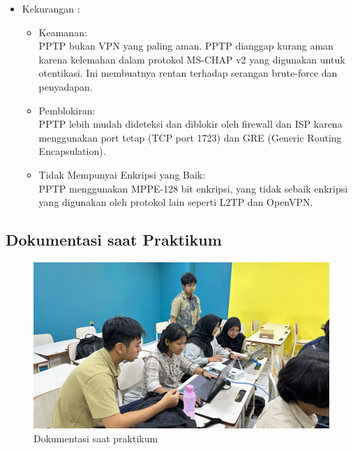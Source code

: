\begin{enumerate}
\begin{itemize}
		\item Kekurangan :
		\begin{itemize}
			\item[\ding{56}] Keamanan: \\ PPTP bukan VPN yang paling aman. PPTP dianggap kurang aman karena kelemahan dalam protokol MS-CHAP v2 yang digunakan untuk otentikasi. Ini membuatnya rentan terhadap serangan brute-force dan penyadapan.
			\item[\ding{56}] Pemblokiran: \\ PPTP lebih mudah dideteksi dan diblokir oleh firewall dan ISP karena menggunakan port tetap (TCP port 1723) dan GRE (Generic Routing Encapsulation).
			\item[\ding{56}] Tidak Mempunyai Enkripsi yang Baik: \\ PPTP menggunakan MPPE-128 bit enkripsi, yang tidak sebaik enkripsi yang digunakan oleh protokol lain seperti L2TP dan OpenVPN.
		\end{itemize}
	\end{itemize}

\end{enumerate}

\subsection{Dokumentasi saat Praktikum}

\begin{figure}[H]
	\centering
	\includegraphics[width=0.75\linewidth]{P4/img/dokumpraktikum.jpg}
	\caption{Dokumentasi saat praktikum}
	\label{fig:gambar32}
\end{figure}